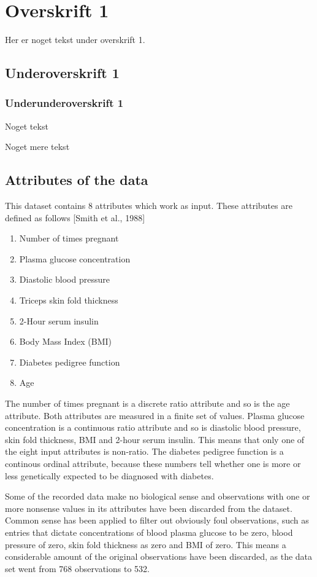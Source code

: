 \section{Overskrift 1}

Her er noget tekst under overskrift 1.

\subsection{Underoverskrift 1}

\subsubsection{Underunderoverskrift 1}

Noget tekst

Noget mere tekst


\subsection{Attributes of the data}
This dataset contains 8 attributes which work as input. These attributes are defined as follows
[Smith et al., 1988]
\begin{enumerate}
\item Number of times pregnant
\item Plasma glucose concentration
\item Diastolic blood pressure
\item Triceps skin fold thickness
\item 2-Hour serum insulin
\item Body Mass Index (BMI)
\item Diabetes pedigree function
\item Age
\end{enumerate}

The number of times pregnant is a discrete ratio attribute and so is
the age attribute. Both attributes are measured in a finite set of values.
Plasma glucose concentration is a continuous ratio attribute
and so is diastolic blood pressure, skin fold thickness, BMI and 2-hour serum
insulin. This means that only one of the eight input attributes is non-ratio.
The diabetes pedigree function is a continous ordinal attribute, because these
numbers tell whether one is more or less genetically expected to be diagnosed
with diabetes.
\bigskip

Some of the recorded data make no biological sense and observations with one or
more nonsense values in its attributes have been discarded from the dataset.
Common sense has been applied to filter out obviously foul observations, such
as entries that dictate concentrations of blood plasma glucose to be zero, blood
pressure of zero, skin fold thickness as zero and BMI of zero. This means a
considerable amount of the original observations have been discarded, as the
data set went from 768 observations to 532.
\bigskip

